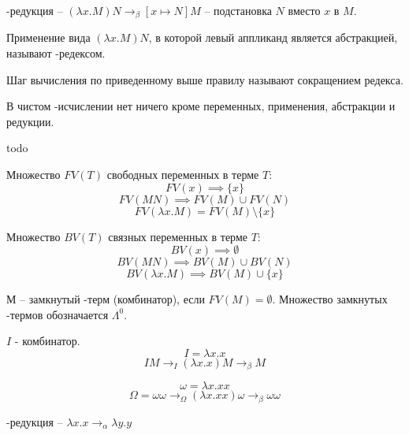 \begin{definition}
    \beta-редукция -- $(\lambda x. M) N \rightarrow_{\beta} [x \mapsto N] M$ -- подстановка $N$ вместо $x$ в $M$.
\end{definition}
\begin{definition}
    Применение вида $(\lambda x. M) N$, в которой левый аппликанд является абстракцией, называют \beta-редексом.
\end{definition}
\begin{definition}
    Шаг вычисления по приведенному выше правилу называют сокращением редекса.
\end{definition}
\begin{definition}
    В чистом \lambda-исчислении нет ничего кроме переменных, применения, абстракции и редукции.
\end{definition} 

todo
\begin{definition}
    Множество $FV(T)$ свободных переменных в терме $T$:
    $$FV(x) \implies \{x\}$$
    $$FV(M N) \implies FV(M) \cup FV(N)$$
    $$FV(\lambda x. M) = FV(M) \setminus \{x\}$$
\end{definition}

\begin{definition}
    Множество $BV(T)$ связных переменных в терме $T$:
    $$BV(x) \implies \emptyset$$
    $$BV(M N) \implies BV(M) \cup BV(N)$$
    $$BV(\lambda x. M) \implies BV(M) \cup \{x\}$$
\end{definition}


\begin{definition}
    М -- замкнутый \lambda-терм (комбинатор), если $FV(M) = \emptyset$. Множество замкнутых \lambda-термов обозначается $\Lambda^{0}$.
\end{definition} 
\begin{example}

    $I$ - комбинатор.
    $$I = \lambda x. x$$
    $$IM \rightarrow_{I} (\lambda x. x) M \rightarrow_{\beta} M$$
\end{example}
\begin{example}
    $$\omega = \lambda x. x x$$
    $$\Omega = \omega \omega \rightarrow_{\Omega} (\lambda x. x x) \omega \rightarrow_{\beta} \omega \omega$$
\end{example}

\begin{definition}
    \alpha-редукция -- $\lambda x. x \rightarrow_{\alpha} \lambda y. y$
\end{definition} 

